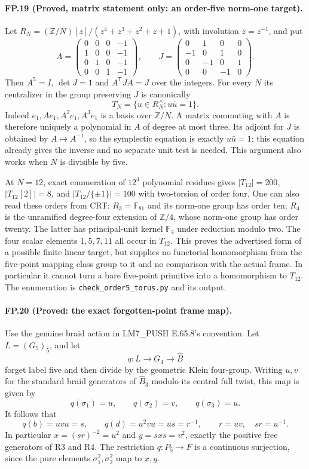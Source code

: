 \paragraph{FP.19 (Proved, matrix statement only: an order-five norm-one target).}
Let $R_N=(\mathbb Z/N)[z]/(z^4+z^3+z^2+z+1)$, with involution
$\bar z=z^{-1}$, and put
\[
 A=\begin{pmatrix}0&0&0&-1\\1&0&0&-1\\0&1&0&-1\\0&0&1&-1\end{pmatrix},
 \qquad
 J=\begin{pmatrix}0&1&0&0\\-1&0&1&0\\0&-1&0&1\\0&0&-1&0\end{pmatrix}.
\]
Then $A^5=I$, $\det J=1$ and $A^{\mathsf T}JA=J$ over the integers.
For every $N$ its centralizer in the group preserving $J$ is canonically
\[
 T_N=\{u\in R_N^{\times}:u\bar u=1\}.
\]
Indeed $e_1,Ae_1,A^2e_1,A^3e_1$ is a basis over $\mathbb Z/N$.
A matrix commuting with $A$ is therefore uniquely a polynomial in $A$ of
degree at most three. Its adjoint for $J$ is obtained by
$A\mapsto A^{-1}$, so the symplectic equation is exactly $u\bar u=1$;
this equation already gives the inverse and no separate unit test is
needed. This argument also works when $N$ is divisible by five.

At $N=12$, exact enumeration of $12^4$ polynomial residues gives
$|T_{12}|=200$, $|T_{12}[2]|=8$, and
$|T_{12}/\{\pm1\}|=100$ with two-torsion of order four. One can also
read these orders from CRT: $R_3=\mathbb F_{81}$ and its norm-one group
has order ten; $R_4$ is the unramified degree-four extension of
$\mathbb Z/4$, whose norm-one group has order twenty. The latter has
principal-unit kernel $\mathbb F_4$ under reduction modulo two.
The four scalar elements $1,5,7,11$ all occur in $T_{12}$.
This proves the advertised form of a possible finite linear target,
but supplies no functorial homomorphism from the five-point mapping class
group to it and no comparison with the actual frame. In particular it
cannot turn a bare five-point primitive into a homomorphism to $T_{12}$.
The enumeration is \texttt{check\_order5\_torus.py} and its output.

\paragraph{FP.20 (Proved: the exact forgotten-point frame map).}
Use the genuine braid action in LM7\_PUSH E.65.8's convention. Let
$L=(G_5)_5$, and let
\[
 q:L\longrightarrow G_4\longrightarrow\widehat B
\]
forget label five and then divide by the geometric Klein four-group.
Writing $u,v$ for the standard braid generators of $\widehat B_3$ modulo
its central full twist, this map is given by
\[
 q(\sigma_1)=u,\qquad q(\sigma_2)=v,\qquad q(\sigma_3)=u.
\]
It follows that
\[
 q(b)=uvu=s,\qquad q(d)=u^2vu=u s=r^{-1},\qquad
 r=uv,\quad sr=u^{-1}.
\]
In particular $x=(sr)^{-2}=u^2$ and $y=sxs=v^2$, exactly the positive
free generators of R3 and R4. The restriction $q:P_5\to F$ is a
continuous surjection, since the pure elements $\sigma_1^2,\sigma_2^2$
map to $x,y$.

